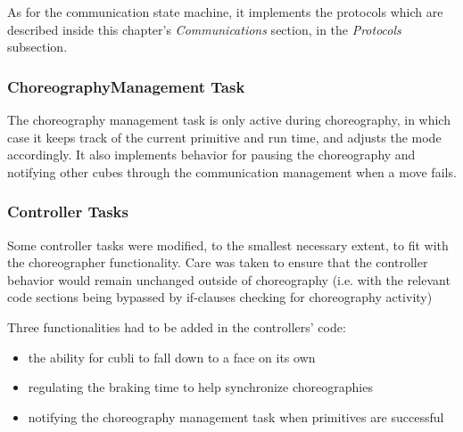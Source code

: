 As for the communication state machine, it implements the protocols which are described inside this chapter's \textit{Communications} section, in the \textit{Protocols} subsection. 

\subsubsection{ChoreographyManagement Task}

The choreography management task is only active during choreography, in which case it keeps track of the current primitive and run time, and adjusts the mode accordingly. It also implements behavior for pausing the choreography and notifying other cubes through the communication management when a move fails.



\subsubsection{Controller Tasks}

Some controller tasks were modified, to the smallest necessary extent, to fit with the choreographer functionality. Care was taken to ensure that the controller behavior would remain unchanged outside of choreography (i.e. with the relevant code sections being bypassed by if-clauses checking for choreography activity)

Three functionalities had to be added in the controllers' code:
\begin{itemize}
\item the ability for cubli to fall down to a face on its own
\item regulating the braking time to help synchronize choreographies
\item notifying the choreography management task when primitives are successful
\end{itemize}

